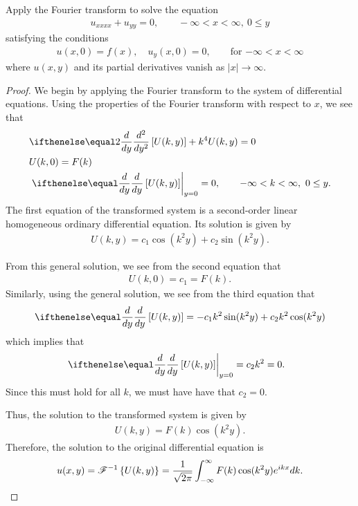 \begin{problem}{2.47}
  Apply the Fourier transform to solve the equation
  \begin{align*}
    u_{xxxx}+u_{yy} = 0, \qquad -\infty< x < \infty,\ 0 \leq y
  \end{align*}
  satisfying the conditions
  \begin{align*}
    u(x, 0) = f(x), \quad u_y(x,0) = 0, \qquad \text{for $-\infty < x < \infty$}
  \end{align*}
  where $u(x, y)$ and its partial derivatives vanish as $|x| \to \infty$.
\end{problem}

\begin{proof}
  We begin by applying the Fourier transform to the system of differential equations. Using
  the properties of the Fourier transform with respect to $x$, we see that
  \begin{align*}
    &\der{y}{2}\left[U(k, y)\right] + k^4 U(k, y) = 0 \\
    &U(k, 0) = F(k)\\
    &\left. \der{y}{}\left[U(k, y)\right] \right \rvert_{y=0} = 0, \qquad -\infty < k < \infty,\ 0 \leq y.
  \end{align*}
  The first equation of the transformed system is a second-order linear homogeneous ordinary differential equation. Its solution
  is given by
  \begin{align*}
    U(k, y) = c_1 \cos(k^2 y) + c_2  \sin (k^2 y).
  \end{align*}

  From this general solution, we see from the second equation that
  \begin{align*}
    U(k, 0) = c_1 = F(k).
  \end{align*}
  Similarly, using the general solution, we see from the third equation that
  \begin{align*}
    \der{y}{}\left[U(k,y)\right] = -c_1 k^2 \sin(k^2y) + c_2 k^2 \cos(k^2 y)
  \end{align*}
  which implies that
  \begin{align*}
    &\left. \der{y}{}\left[U(k, y)\right] \right \rvert_{y=0} = c_2 k^2 = 0.
  \end{align*}
  Since this must hold for all $k$, we must have have that $c_2 = 0$.

  Thus, the solution to the transformed system is given by
  \begin{align*}
    U(k, y) = F(k)\cos(k^2y).
  \end{align*}
  Therefore, the solution to the original differential equation is
  \begin{align*}
    u(x, y) = \mathscr{F}^{-1}\left\{ {U(k, y)} \right\} = \frac{1}{\sqrt{2\pi}}\int_{-\infty}^\infty F(k)\cos(k^2 y) e^{ikx} dk.
  \end{align*}
\end{proof}
\newpage

